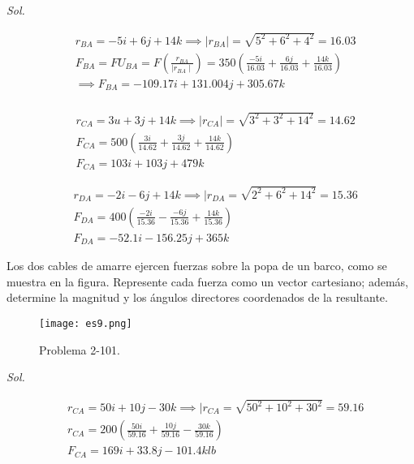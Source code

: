 \textit{ Sol.}

\begin{align*}
	 & r_{BA}=-5i+6j+14k\implies \mid r_{BA} \mid=\sqrt{5^2+6^2+4^2}=16.03                                                                  \\
	 & F_{BA}=FU_{BA}=F\left( \frac{r_{BA}}{\mid r_{BA} \mid} \right)=350\left( \frac{-5i}{16.03}+\frac{6j}{16.03}+\frac{14k}{16.03}\right) \\
	 & \implies F_{BA}=-109.17i+131.004j+305.67k                                                                                            \\
\end{align*}

\begin{align*}
	 & r_{CA}=3u+3j+14k\implies \mid r_{CA}\mid =\sqrt{3^2+3^2+14^2}=14.62          \\
	 & F_{CA}=500\left( \frac{3i}{14.62}+\frac{3j}{14.62}+\frac{14k}{14.62} \right) \\
	 & F_{CA}=103i+103j+479k
\end{align*}

\begin{align*}
	 & r_{DA}=-2i-6j+14k\implies \mid r_{DA}=\sqrt{2^2+6^2+14^2}=15.36               \\
	 & F_{DA}=400\left(\frac{-2i}{15.36}-\frac{-6j}{15.36}+\frac{14k}{15.36} \right) \\
	 & F_{DA}=-52.1i-156.25j+365k
\end{align*}


\begin{problem}
Los dos cables de amarre ejercen fuerzas sobre la popa de un barco, como se muestra en la figura. Represente cada fuerza como un vector cartesiano; además, determine la magnitud y los ángulos directores coordenados de la resultante.
\end{problem}

\begin{figure}[h!]
	\centering
	\texttt{[image: es9.png]}
	\caption{Problema 2-101.}
	\label{es9png}
\end{figure}

\textit{ Sol.}

\begin{align*}
	 & r_{CA}=50i+10j-30k\implies \mid r_{CA}=\sqrt{50^2+10^2+30^2}=59.16            \\
	 & r_{CA}=200\left(\frac{50i}{59.16}+\frac{10j}{59.16}-\frac{30k}{59.16} \right) \\
	 & F_{CA}=169i+33.8j-101.4klb
\end{align*}

